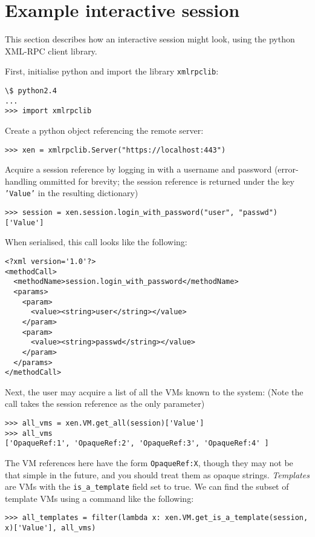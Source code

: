 \section{Example interactive session}

This section describes how an interactive session might look, using the python
XML-RPC client library. 

First, initialise python and import the library {\tt xmlrpclib}:

\begin{verbatim}
\$ python2.4
...
>>> import xmlrpclib
\end{verbatim}

Create a python object referencing the remote server:

\begin{verbatim}
>>> xen = xmlrpclib.Server("https://localhost:443")
\end{verbatim}

Acquire a session reference by logging in with a username and password
(error-handling ommitted for brevity; the session reference is returned under the
key {\tt 'Value'} in the resulting dictionary)

\begin{verbatim}
>>> session = xen.session.login_with_password("user", "passwd")['Value']
\end{verbatim}

When serialised, this call looks like the following:

\begin{verbatim}
<?xml version='1.0'?>
<methodCall>
  <methodName>session.login_with_password</methodName>
  <params>
    <param>
      <value><string>user</string></value>
    </param>
    <param>
      <value><string>passwd</string></value>
    </param>
  </params>
</methodCall>
\end{verbatim}

Next, the user may acquire a list of all the VMs known to the system: (Note the
call takes the session reference as the only parameter)

\begin{verbatim}
>>> all_vms = xen.VM.get_all(session)['Value']
>>> all_vms
['OpaqueRef:1', 'OpaqueRef:2', 'OpaqueRef:3', 'OpaqueRef:4' ]
\end{verbatim}

The VM references here have the form {\tt OpaqueRef:X}, though they may not be 
that simple in the future, and you should treat them as opaque strings. 
{\em Templates} are VMs with the {\tt is\_a\_template} field set to true. We can
find the subset of template VMs using a command like the following:
\begin{verbatim}
>>> all_templates = filter(lambda x: xen.VM.get_is_a_template(session, x)['Value'], all_vms)
\end{verbatim}
 
